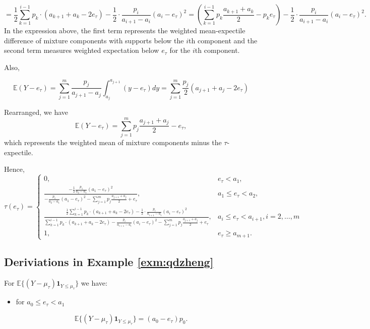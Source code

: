\documentclass[
]{article}
\providecommand{\tightlist}{%
  \setlength{\itemsep}{0pt}\setlength{\parskip}{0pt}}
\theoremstyle{definition}
\theoremstyle{definition}
\theoremstyle{definition}
\theoremstyle{definition}
\theoremstyle{remark}
\begin{document}
\[=\frac 12\sum_{k=1}^{i-1}p_k\cdot (a_{k+1}+a_{k}-2e_\tau) -\frac 12 \cdot \frac{p_i}{a_{i+1}-a_i}(a_i-e_\tau)^2 =\left(\sum_{k=1}^{i-1}{p_k}\frac{a_{k+1}+a_{k}}2-p_ke_\tau\right) -\frac 12 \cdot \frac{p_i}{a_{i+1}-a_i}(a_i-e_\tau)^2 .\]
In the expression above, the first term represents the weighted mean-expectile difference of mixture components with supports below the \(i\)th component and the second term measures weighted expectation below \(e_\tau\) for the \(i\)th component.

Also,

\[\mathbb E(Y-e_\tau) =\sum_{j=1}^m\frac{p_j}{a_{j+1}-a_j}\int_{a_j}^{a_{j+1}}(y-e_\tau) dy = 
\sum_{j=1}^m\frac{p_j}2(a_{j+1}+a_j-2e_\tau)\]

Rearranged, we have
\[\mathbb E(Y-e_\tau)  = \sum_{j=1}^mp_j\frac{a_{j+1}+a_j}2 -e_\tau,\]
which represents the weighted mean of mixture components minus the \(\tau\)-expectile.

Hence,
\begin{equation}\tau(e_\tau) = \begin{cases}
0,&e_\tau<a_1,\\
\frac{-\frac 12\frac{p_1}{a_2-a_1}(a_1-e_\tau)^2}  {-\frac{p_1}{a_2-a_1}(a_1-e_\tau)^2- \sum_{j=1}^mp_j\frac{a_{j+1}+a_j}2 +e_\tau} ,&a_1\leq e_\tau< a_2,\\
\frac{\frac 12\sum_{k=1}^{i-1}p_k\cdot (a_{k+1}+a_{k}-2e_\tau) -\frac 12 \cdot \frac{p_i}{a_{i+1}-a_i}(a_i-e_\tau)^2}  {\sum_{k=1}^{i-1}p_k\cdot (a_{k+1}+a_{k}-2e_\tau) -\frac{p_i}{a_{i+1}-a_i}(a_i-e_\tau)^2- \sum_{j=1}^mp_j\frac{a_{j+1}+a_j}2 +e_\tau} ,&a_i\leq e_\tau< a_{i+1},i=2,\ldots, m\\
1, &e_\tau\geq a_{m+1}.
\end{cases}\end{equation}

\hypertarget{deriviations-in-example-refexmqdzheng}{%
\subsection{Deriviations in Example \ref{exm:qdzheng}}\label{deriviations-in-example-refexmqdzheng}}

For \(\mathbb E\{(Y-\mu_\tau)\mathbf 1_{Y\leq\mu_\tau}\}\) we have:

\begin{itemize}
\tightlist
\item
  for \(a_0\leq e_\tau< a_1\)
\end{itemize}

\[\mathbb E\{(Y-\mu_\tau)\mathbf 1_{Y\leq\mu_\tau}\} = (a_0-e_\tau)p_0.\]
\end{document}
